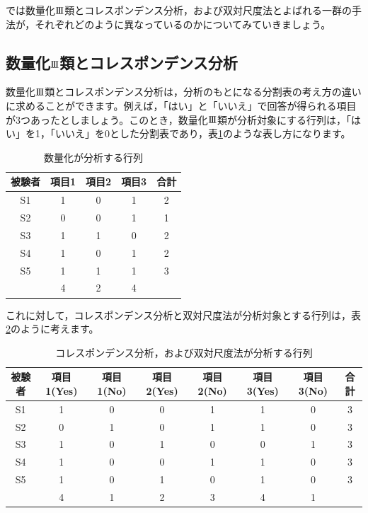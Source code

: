 \documentclass{ltjsbook}
\begin{document}
では数量化$\mathrm{I}\hspace{-1.2pt}\mathrm{I}\hspace{-1.2pt}\mathrm{I}$類とコレスポンデンス分析，および双対尺度法とよばれる一群の手法が，それぞれどのように異なっているのかについてみていきましょう。

\subsection{数量化$\mathrm{I}\hspace{-1.2pt}\mathrm{I}\hspace{-1.2pt}\mathrm{I}$類とコレスポンデンス分析}
数量化$\mathrm{I}\hspace{-1.2pt}\mathrm{I}\hspace{-1.2pt}\mathrm{I}$類とコレスポンデンス分析は，分析のもとになる分割表の考え方の違いに求めることができます。例えば，「はい」と「いいえ」で回答が得られる項目が3つあったとしましょう。このとき，数量化$\mathrm{I}\hspace{-1.2pt}\mathrm{I}\hspace{-1.2pt}\mathrm{I}$類が分析対象にする行列は，「はい」を1，「いいえ」を0とした分割表であり，表\ref{hayashi}のような表し方になります。
\begin{table}[ht]
	\begin{center}
		\caption{数量化が分析する行列}
		\begin{tabular}{c|ccc|c}
			被験者 & 項目1 & 項目2 & 項目3 & 合計 \\
			\hline
			S1  & 1   & 0   & 1   & 2  \\
			S2  & 0   & 0   & 1   & 1  \\
			S3  & 1   & 1   & 0   & 2  \\
			S4  & 1   & 0   & 1   & 2  \\
			S5  & 1   & 1   & 1   & 3  \\
			\hline
			    & 4   & 2   & 4   &    \\
		\end{tabular}
		\label{hayashi}
	\end{center}
\end{table}

これに対して，コレスポンデンス分析と双対尺度法が分析対象とする行列は，表\ref{corepon}のように考えます。
\begin{table}[ht]
	\begin{center}
		\caption{コレスポンデンス分析，および双対尺度法が分析する行列}
		\begin{tabular}{c|cccccc|c}
			被験者 & 項目1(Yes) & 項目1(No) & 項目2(Yes) & 項目2(No) & 項目3(Yes) & 項目3(No) & 合計 \\
			\hline
			S1  & 1        & 0       & 0        & 1       & 1        & 0       & 3  \\
			S2  & 0        & 1       & 0        & 1       & 1        & 0       & 3  \\
			S3  & 1        & 0       & 1        & 0       & 0        & 1       & 3  \\
			S4  & 1        & 0       & 0        & 1       & 1        & 0       & 3  \\
			S5  & 1        & 0       & 1        & 0       & 1        & 0       & 3  \\
			\hline
			    & 4        & 1       & 2        & 3       & 4        & 1       &    \\
		\end{tabular}
		\label{corepon}
	\end{center}
\end{table}
\end{document}
